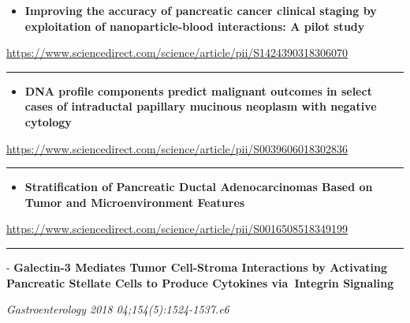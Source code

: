 \documentclass[]{article}
\providecommand{\tightlist}{%
  \setlength{\itemsep}{0pt}\setlength{\parskip}{0pt}}
\begin{document}
\begin{itemize}
\tightlist
\item
  \textbf{Improving the accuracy of pancreatic cancer clinical staging
  by exploitation of nanoparticle-blood interactions: A pilot study}
\end{itemize}

\url{https://www.sciencedirect.com/science/article/pii/S1424390318306070}

\begin{center}\rule{0.5\linewidth}{\linethickness}\end{center}

\begin{itemize}
\tightlist
\item
  \textbf{DNA profile components predict malignant outcomes in select
  cases of intraductal papillary mucinous neoplasm with negative
  cytology}
\end{itemize}

\url{https://www.sciencedirect.com/science/article/pii/S0039606018302836}

\begin{center}\rule{0.5\linewidth}{\linethickness}\end{center}

\begin{itemize}
\tightlist
\item
  \textbf{Stratification of Pancreatic Ductal Adenocarcinomas Based on
  Tumor and Microenvironment Features}
\end{itemize}

\url{https://www.sciencedirect.com/science/article/pii/S0016508518349199}

\begin{center}\rule{0.5\linewidth}{\linethickness}\end{center}

 - \textbf{Galectin-3 Mediates Tumor Cell-Stroma Interactions by
Activating Pancreatic Stellate Cells to Produce Cytokines via~Integrin
Signaling}

\emph{Gastroenterology 2018 04;154(5):1524-1537.e6}
\end{document}
